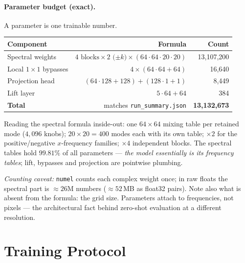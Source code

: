 \documentclass[11pt,a4paper]{article}
\begin{document}
\paragraph{Parameter budget (exact).} A parameter is one trainable number.
\begin{center}
\begin{tabular}{@{}lrr@{}}
\toprule
Component & Formula & Count \\
\midrule
Spectral weights & $4 \text{ blocks} \times 2 \text{ ($\pm k$)} \times (64 \cdot 64 \cdot 20 \cdot 20)$ & 13{,}107{,}200 \\
Local $1\times1$ bypasses & $4 \times (64 \cdot 64 + 64)$ & 16{,}640 \\
Projection head & $(64 \cdot 128 + 128) + (128 \cdot 1 + 1)$ & 8{,}449 \\
Lift layer & $5 \cdot 64 + 64$ & 384 \\
\midrule
\textbf{Total} & matches \texttt{run\_summary.json} & \textbf{13{,}132{,}673} \\
\bottomrule
\end{tabular}
\end{center}
Reading the spectral formula inside-out: one $64\times 64$ mixing table per
retained mode ($4{,}096$ knobs); $20\times 20 = 400$ modes each with its own
table; $\times 2$ for the positive/negative $x$-frequency families;
$\times 4$ independent blocks. The spectral tables hold $99.81\%$ of all
parameters --- \emph{the model essentially is its frequency tables}; lift,
bypasses and projection are pointwise plumbing.

\emph{Counting caveat:} \texttt{numel} counts each complex weight once; in raw
floats the spectral part is $\approx 26$M numbers ($\approx 52$\,MB as
float32 pairs). Note also what is absent from the formula: the grid size.
Parameters attach to frequencies, not pixels --- the architectural fact behind
zero-shot evaluation at a different resolution.

\section{Training Protocol}
\end{document}
